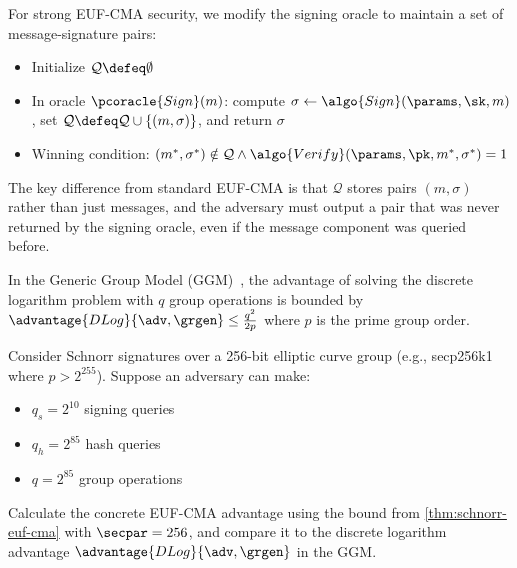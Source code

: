 \ifsolutions
\begin{mysolution}
  For strong EUF-CMA security, we modify the signing oracle to maintain a set of message-signature pairs:
  \begin{itemize}
    \item Initialize $\mathcal{Q} \defeq \emptyset$
    \item In oracle $\pcoracle{Sign}(m)$: compute $\sigma \gets \algo{Sign}(\params, \sk, m)$, set $\mathcal{Q} \defeq \mathcal{Q} \cup \{(m, \sigma)\}$, and return $\sigma$
    \item Winning condition: $(m^*, \sigma^*) \notin \mathcal{Q} \wedge \algo{Verify}(\params, \pk, m^*, \sigma^*) = 1$
  \end{itemize}

  The key difference from standard EUF-CMA is that $\mathcal{Q}$ stores pairs $(m, \sigma)$ rather than just messages, and the adversary must output a pair that was never returned by the signing oracle, even if the message component was queried before.
\end{mysolution}
\fi


\begin{exercise}
  In the Generic Group Model (GGM)~\cite{EC:Shoup97}, the advantage of solving the discrete logarithm problem with $q$ group operations is bounded by $\advantage{DLog}{\adv, \grgen} \leq \frac{q^2}{2p}$ where $p$ is the prime group order.
  
  Consider Schnorr signatures over a 256-bit elliptic curve group (e.g., secp256k1 where $p > 2^{255}$). Suppose an adversary can make:
  \begin{itemize}
    \item $q_s = 2^{10}$ signing queries
    \item $q_h = 2^{85}$ hash queries
    \item $q = 2^{85}$ group operations
  \end{itemize}
  
  Calculate the concrete EUF-CMA advantage using the bound from \autoref{thm:schnorr-euf-cma} with $\secpar = 256$, and compare it to the discrete logarithm advantage $\advantage{DLog}{\adv, \grgen}$ in the GGM.
\end{exercise}


